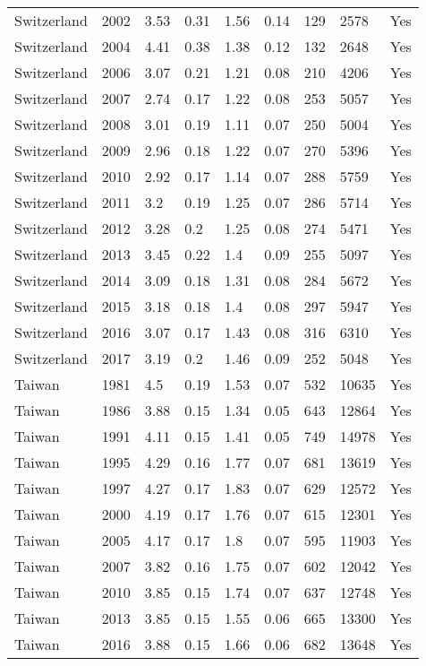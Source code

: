 \begin{tabular}{lllllllll}
Switzerland & 2002 & 3.53 & 0.31 & 1.56 & 0.14 & 129 & 2578 & Yes \\ 
Switzerland & 2004 & 4.41 & 0.38 & 1.38 & 0.12 & 132 & 2648 & Yes \\ 
Switzerland & 2006 & 3.07 & 0.21 & 1.21 & 0.08 & 210 & 4206 & Yes \\ 
Switzerland & 2007 & 2.74 & 0.17 & 1.22 & 0.08 & 253 & 5057 & Yes \\ 
Switzerland & 2008 & 3.01 & 0.19 & 1.11 & 0.07 & 250 & 5004 & Yes \\ 
Switzerland & 2009 & 2.96 & 0.18 & 1.22 & 0.07 & 270 & 5396 & Yes \\ 
Switzerland & 2010 & 2.92 & 0.17 & 1.14 & 0.07 & 288 & 5759 & Yes \\ 
Switzerland & 2011 & 3.2 & 0.19 & 1.25 & 0.07 & 286 & 5714 & Yes \\ 
Switzerland & 2012 & 3.28 & 0.2 & 1.25 & 0.08 & 274 & 5471 & Yes \\ 
Switzerland & 2013 & 3.45 & 0.22 & 1.4 & 0.09 & 255 & 5097 & Yes \\ 
Switzerland & 2014 & 3.09 & 0.18 & 1.31 & 0.08 & 284 & 5672 & Yes \\ 
Switzerland & 2015 & 3.18 & 0.18 & 1.4 & 0.08 & 297 & 5947 & Yes \\ 
Switzerland & 2016 & 3.07 & 0.17 & 1.43 & 0.08 & 316 & 6310 & Yes \\ 
Switzerland & 2017 & 3.19 & 0.2 & 1.46 & 0.09 & 252 & 5048 & Yes \\ 
Taiwan & 1981 & 4.5 & 0.19 & 1.53 & 0.07 & 532 & 10635 & Yes \\ 
Taiwan & 1986 & 3.88 & 0.15 & 1.34 & 0.05 & 643 & 12864 & Yes \\ 
Taiwan & 1991 & 4.11 & 0.15 & 1.41 & 0.05 & 749 & 14978 & Yes \\ 
Taiwan & 1995 & 4.29 & 0.16 & 1.77 & 0.07 & 681 & 13619 & Yes \\ 
Taiwan & 1997 & 4.27 & 0.17 & 1.83 & 0.07 & 629 & 12572 & Yes \\ 
Taiwan & 2000 & 4.19 & 0.17 & 1.76 & 0.07 & 615 & 12301 & Yes \\ 
Taiwan & 2005 & 4.17 & 0.17 & 1.8 & 0.07 & 595 & 11903 & Yes \\ 
Taiwan & 2007 & 3.82 & 0.16 & 1.75 & 0.07 & 602 & 12042 & Yes \\ 
Taiwan & 2010 & 3.85 & 0.15 & 1.74 & 0.07 & 637 & 12748 & Yes \\ 
Taiwan & 2013 & 3.85 & 0.15 & 1.55 & 0.06 & 665 & 13300 & Yes \\ 
Taiwan & 2016 & 3.88 & 0.15 & 1.66 & 0.06 & 682 & 13648 & Yes \\ 

\end{tabular}
